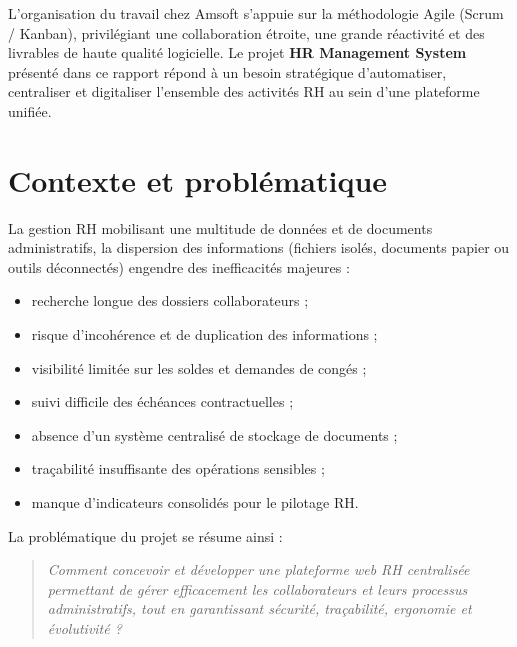 \documentclass[12pt,a4paper]{report}
\begin{document}
L'organisation du travail chez Amsoft s'appuie sur la méthodologie Agile (Scrum / Kanban), privilégiant une collaboration étroite, une grande réactivité et des livrables de haute qualité logicielle. Le projet \textbf{HR Management System} présenté dans ce rapport répond à un besoin stratégique d'automatiser, centraliser et digitaliser l'ensemble des activités RH au sein d'une plateforme unifiée.

\section{Contexte et problématique}
La gestion RH mobilisant une multitude de données et de documents administratifs, la dispersion des informations (fichiers isolés, documents papier ou outils déconnectés) engendre des inefficacités majeures :
\begin{itemize}
    \item recherche longue des dossiers collaborateurs ;
    \item risque d'incohérence et de duplication des informations ;
    \item visibilité limitée sur les soldes et demandes de congés ;
    \item suivi difficile des échéances contractuelles ;
    \item absence d'un système centralisé de stockage de documents ;
    \item traçabilité insuffisante des opérations sensibles ;
    \item manque d'indicateurs consolidés pour le pilotage RH.
\end{itemize}

La problématique du projet se résume ainsi :
\begin{quotation}
    \itshape
    Comment concevoir et développer une plateforme web RH centralisée permettant de gérer efficacement les collaborateurs et leurs processus administratifs, tout en garantissant sécurité, traçabilité, ergonomie et évolutivité ?
\end{quotation}
\end{document}
